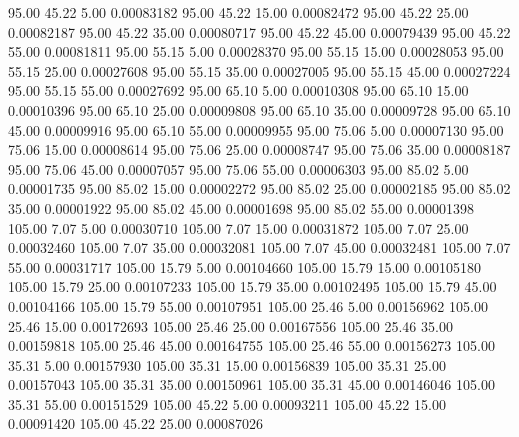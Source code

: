      95.00     45.22      5.00     0.00083182
     95.00     45.22     15.00     0.00082472
     95.00     45.22     25.00     0.00082187
     95.00     45.22     35.00     0.00080717
     95.00     45.22     45.00     0.00079439
     95.00     45.22     55.00     0.00081811
     95.00     55.15      5.00     0.00028370
     95.00     55.15     15.00     0.00028053
     95.00     55.15     25.00     0.00027608
     95.00     55.15     35.00     0.00027005
     95.00     55.15     45.00     0.00027224
     95.00     55.15     55.00     0.00027692
     95.00     65.10      5.00     0.00010308
     95.00     65.10     15.00     0.00010396
     95.00     65.10     25.00     0.00009808
     95.00     65.10     35.00     0.00009728
     95.00     65.10     45.00     0.00009916
     95.00     65.10     55.00     0.00009955
     95.00     75.06      5.00     0.00007130
     95.00     75.06     15.00     0.00008614
     95.00     75.06     25.00     0.00008747
     95.00     75.06     35.00     0.00008187
     95.00     75.06     45.00     0.00007057
     95.00     75.06     55.00     0.00006303
     95.00     85.02      5.00     0.00001735
     95.00     85.02     15.00     0.00002272
     95.00     85.02     25.00     0.00002185
     95.00     85.02     35.00     0.00001922
     95.00     85.02     45.00     0.00001698
     95.00     85.02     55.00     0.00001398
    105.00      7.07      5.00     0.00030710
    105.00      7.07     15.00     0.00031872
    105.00      7.07     25.00     0.00032460
    105.00      7.07     35.00     0.00032081
    105.00      7.07     45.00     0.00032481
    105.00      7.07     55.00     0.00031717
    105.00     15.79      5.00     0.00104660
    105.00     15.79     15.00     0.00105180
    105.00     15.79     25.00     0.00107233
    105.00     15.79     35.00     0.00102495
    105.00     15.79     45.00     0.00104166
    105.00     15.79     55.00     0.00107951
    105.00     25.46      5.00     0.00156962
    105.00     25.46     15.00     0.00172693
    105.00     25.46     25.00     0.00167556
    105.00     25.46     35.00     0.00159818
    105.00     25.46     45.00     0.00164755
    105.00     25.46     55.00     0.00156273
    105.00     35.31      5.00     0.00157930
    105.00     35.31     15.00     0.00156839
    105.00     35.31     25.00     0.00157043
    105.00     35.31     35.00     0.00150961
    105.00     35.31     45.00     0.00146046
    105.00     35.31     55.00     0.00151529
    105.00     45.22      5.00     0.00093211
    105.00     45.22     15.00     0.00091420
    105.00     45.22     25.00     0.00087026
